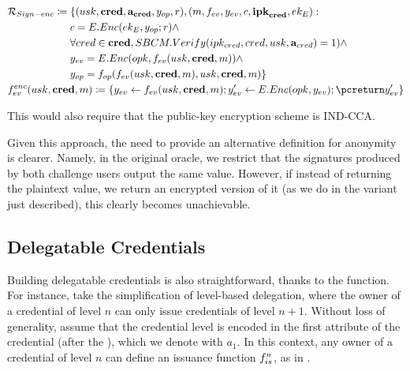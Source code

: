 \begin{align}
  & \NIZKRel_{\Sign-enc} \coloneqq \lbrace (\usk,\scred,\attrs_{\scred},\yinsp,r),
    (\msg,\feval,\yeval,\Ec,\sipk_{\scred},\Eek): \nonumber \\
  & \hspace*{6.00em}\Ec = \EEnc(\Eek,\yinsp;r) \land \nonumber \\
  & \hspace*{6.00em}\forall \cred \in \scred,\SBCMVerify(\ipk_{\cred},\cred,\usk,
  \attrs_{\cred}) = 1) \land \nonumber \\
  & \hspace*{6.00em}\yeval = \EEnc(\opk,\feval(\usk,\scred,\msg)) \land \nonumber \\
  & \hspace*{6.00em}\yinsp = \finsp(\feval(\usk,\scred,\msg),\usk,\scred,\msg)
    \rbrace \nonumber \\
  & \feval^{enc}(\usk,\scred,\msg) \coloneqq \lbrace \yeval
    \gets \feval(\usk,\scred,\msg); \yeval' \gets \EEnc(\opk,\yeval); \pcreturn
    \yeval' \rbrace \label{eq:uas-mps-funcs}
\end{align}

This would also require that the public-key encryption scheme is IND-CCA.

Given this approach, the need to provide an alternative definition for anonymity
is clearer. Namely, in the original \CHALb oracle, we restrict that the
signatures produced by both challenge users output the same \yeval value.
However, if instead of returning the plaintext \yeval value, we return an
encrypted version of it (as we do in the variant just described), this clearly
becomes unachievable.


\subsection{Delegatable Credentials}
\label{ssec:uas-delcred}

Building delegatable credentials is also straightforward, thanks to the \fissue
function. For instance, take the simplification of level-based delegation, where
the owner of a credential of level $n$ can only issue credentials of level
$n+1$. Without loss of generality, assume that the credential level is encoded
in the first attribute of the credential (after the \usk), which we denote with
$a_1$. In this context, any owner of a credential of level $n$ can define an
issuance function $f_{is}^n$, as in .

